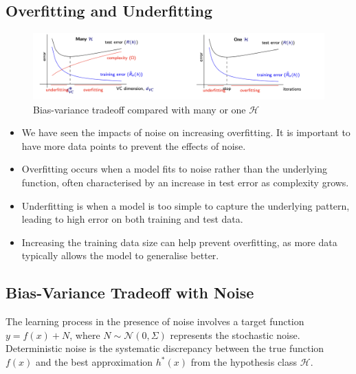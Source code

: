 \subsection{Overfitting and Underfitting}

\begin{figure}[H]
    \centering
    \includegraphics[width=1\linewidth]{img/3_over_under_fit.png}
    \caption{Bias-variance tradeoff compared with many or one $\mathcal{H}$}
    \label{fig:over_under_fit}
\end{figure}


\begin{itemize}
    \item We have seen the impacts of noise on increasing overfitting. It is important to have more data points to prevent the effects of noise.
    \item Overfitting occurs when a model fits to noise rather than the underlying function, often characterised by an increase in test error as complexity grows.
    \item Underfitting is when a model is too simple to capture the underlying pattern, leading to high error on both training and test data.
    \item Increasing the training data size can help prevent overfitting, as more data typically allows the model to generalise better.
\end{itemize}

\subsection{Bias-Variance Tradeoff with Noise}

The learning process in the presence of noise involves a target function \( y = f(x) + N \), where \( N \sim \mathcal{N}(0, \Sigma) \) represents the stochastic noise. Deterministic noise is the systematic discrepancy between the true function \( f(x) \) and the best approximation \( h^*(x) \) from the hypothesis class \( \mathcal{H} \).

